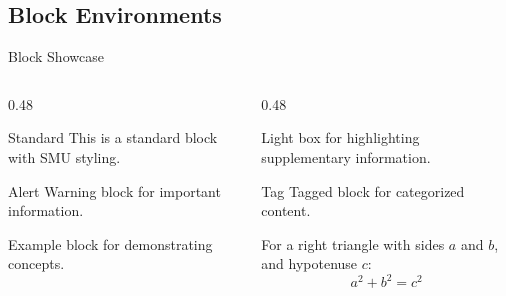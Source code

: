 \documentclass[10pt,aspectratio=1610]{beamer}
\begin{document}
\subsection{Block Environments}

\begin{frame}{Block Showcase}
    \begin{columns}[T]
        \begin{column}{0.48\textwidth}
            \begin{block}{Standard}
                This is a standard block with SMU styling.
            \end{block}
            
            \vspace{0.3em}
            
            \begin{alertblock}{Alert}
                Warning block for important information.
            \end{alertblock}
            
            \vspace{0.3em}
            
            \begin{examples}
                Example block for demonstrating concepts.
            \end{examples}
        \end{column}
        
        \begin{column}{0.48\textwidth}
            \begin{lightbox}
                Light box for highlighting supplementary information.
            \end{lightbox}
            
            \vspace{0.3em}
            
            \begin{tagblock}{Tag}
                Tagged block for categorized content.
            \end{tagblock}
            
            \vspace{0.3em}
            
            \begin{theorem}
                For a right triangle with sides $a$ and $b$, and hypotenuse $c$:
                \[ a^2 + b^2 = c^2 \]
            \end{theorem}
        \end{column}
    \end{columns}
\end{frame}
\end{document}

